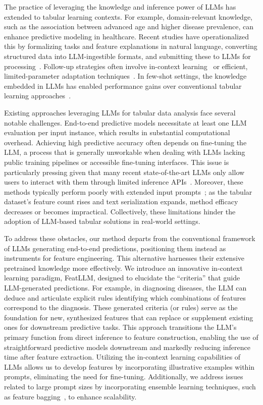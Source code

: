 The practice of leveraging the knowledge and inference power of LLMs has extended to tabular learning contexts. For example, domain-relevant knowledge, such as the association between advanced age and higher disease prevalence, can enhance predictive modeling in healthcare. Recent studies have operationalized this by formalizing tasks and feature explanations in natural language, converting structured data into LLM-ingestible formats, and submitting these to LLMs for processing~\cite{dinh2022lift,wang2023anypredict}. Follow-up strategies often involve in-context learning~\cite{nam2023semi} or efficient, limited-parameter adaptation techniques~\cite{dinh2022lift,hegselmann2023tabllm}. In few-shot settings, the knowledge embedded in LLMs has enabled performance gains over conventional tabular learning approaches~\cite{hegselmann2023tabllm}.

Existing approaches leveraging LLMs for tabular data analysis face several notable challenges. End-to-end predictive models necessitate at least one LLM evaluation per input instance, which results in substantial computational overhead. Achieving high predictive accuracy often depends on fine-tuning the LLM, a process that is generally unworkable when dealing with LLMs lacking public training pipelines or accessible fine-tuning interfaces. This issue is particularly pressing given that many recent state-of-the-art LLMs only allow users to interact with them through limited inference APIs~\cite{anil2023palm,openai2023gpt4}. Moreover, these methods typically perform poorly with extended input prompts~\cite{liu2023lost}; as the tabular dataset’s feature count rises and text serialization expands, method efficacy decreases or becomes impractical. Collectively, these limitations hinder the adoption of LLM-based tabular solutions in real-world settings.

To address these obstacles, our method departs from the conventional framework of LLMs generating end-to-end predictions, positioning them instead as instruments for feature engineering. This alternative harnesses their extensive pretrained knowledge more effectively. We introduce an innovative in-context learning paradigm, \textsf{FeatLLM}, designed to elucidate the “criteria” that guide LLM-generated predictions. For example, in diagnosing diseases, the LLM can deduce and articulate explicit rules identifying which combinations of features correspond to the diagnosis. These generated criteria (or rules) serve as the foundation for new, synthesized features that can replace or supplement existing ones for downstream predictive tasks. This approach transitions the LLM’s primary function from direct inference to feature construction, enabling the use of straightforward predictive models downstream and markedly reducing inference time after feature extraction. Utilizing the in-context learning capabilities of LLMs allows us to develop features by incorporating illustrative examples within prompts, eliminating the need for fine-tuning. Additionally, we address issues related to large prompt sizes by incorporating ensemble learning techniques, such as feature bagging~\cite{breiman2001random}, to enhance scalability.

